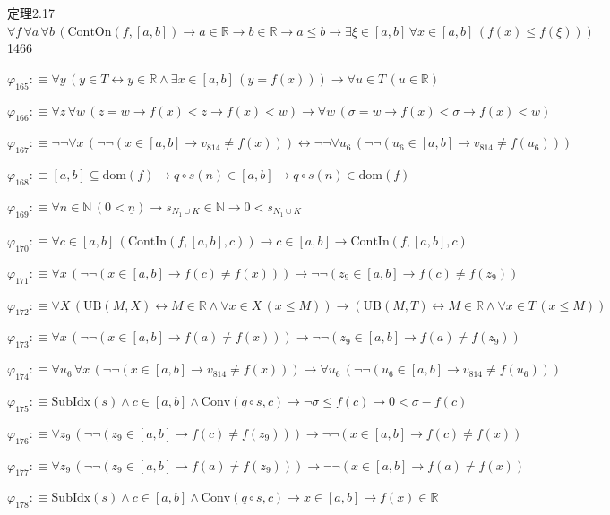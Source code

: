 \begin{fullproof}{定理2.17}{$\forall f\,\forall a\,\forall b\,(\mathrm{ContOn}(f,[a,b]) \to a \in \mathbb{R} \to b \in \mathbb{R} \to a \leq b \to \exists \xi \in [a,b]\,\forall x \in [a,b]\,(f(x) \leq f(\xi)))$}{1466}
\begin{abbrevlist}
\item $\varphi_{165} :\equiv \forall y\,(y \in T \leftrightarrow y \in \mathbb{R} \land \exists x \in [a,b]\,(y = f(x))) \to \forall u \in T\,(u \in \mathbb{R})$
\item $\varphi_{166} :\equiv \forall z\,\forall w\,(z = w \to f(x) < z \to f(x) < w) \to \forall w\,(\sigma = w \to f(x) < \sigma \to f(x) < w)$
\item $\varphi_{167} :\equiv \neg \neg \forall x\,(\neg \neg (x \in [a,b] \to v_{814} \neq f(x))) \leftrightarrow \neg \neg \forall u_{6}\,(\neg \neg (u_{6} \in [a,b] \to v_{814} \neq f(u_{6})))$
\item $\varphi_{168} :\equiv [a,b] \subseteq \mathrm{dom}(f) \to q \circ s(n) \in [a,b] \to q \circ s(n) \in \mathrm{dom}(f)$
\item $\varphi_{169} :\equiv \forall n \in \mathbb{N}\,(0 < \underline{n}) \to s_{N_{1} \cup K} \in \mathbb{N} \to 0 < \underline{s_{N_{1} \cup K}}$
\item $\varphi_{170} :\equiv \forall c \in [a,b]\,(\mathrm{ContIn}(f,[a,b],c)) \to c \in [a,b] \to \mathrm{ContIn}(f,[a,b],c)$
\item $\varphi_{171} :\equiv \forall x\,(\neg \neg (x \in [a,b] \to f(c) \neq f(x))) \to \neg \neg (z_{9} \in [a,b] \to f(c) \neq f(z_{9}))$
\item $\varphi_{172} :\equiv \forall X\,(\mathrm{UB}(M,X) \leftrightarrow M \in \mathbb{R} \land \forall x \in X\,(x \leq M)) \to (\mathrm{UB}(M,T) \leftrightarrow M \in \mathbb{R} \land \forall x \in T\,(x \leq M))$
\item $\varphi_{173} :\equiv \forall x\,(\neg \neg (x \in [a,b] \to f(a) \neq f(x))) \to \neg \neg (z_{9} \in [a,b] \to f(a) \neq f(z_{9}))$
\item $\varphi_{174} :\equiv \forall u_{6}\,\forall x\,(\neg \neg (x \in [a,b] \to v_{814} \neq f(x))) \to \forall u_{6}\,(\neg \neg (u_{6} \in [a,b] \to v_{814} \neq f(u_{6})))$
\item $\varphi_{175} :\equiv \mathrm{SubIdx}(s) \land c \in [a,b] \land \mathrm{Conv}(q \circ s,c) \to \neg \sigma \leq f(c) \to 0 < \sigma - f(c)$
\item $\varphi_{176} :\equiv \forall z_{9}\,(\neg \neg (z_{9} \in [a,b] \to f(c) \neq f(z_{9}))) \to \neg \neg (x \in [a,b] \to f(c) \neq f(x))$
\item $\varphi_{177} :\equiv \forall z_{9}\,(\neg \neg (z_{9} \in [a,b] \to f(a) \neq f(z_{9}))) \to \neg \neg (x \in [a,b] \to f(a) \neq f(x))$
\item $\varphi_{178} :\equiv \mathrm{SubIdx}(s) \land c \in [a,b] \land \mathrm{Conv}(q \circ s,c) \to x \in [a,b] \to f(x) \in \mathbb{R}$

\end{abbrevlist}
\end{fullproof}
